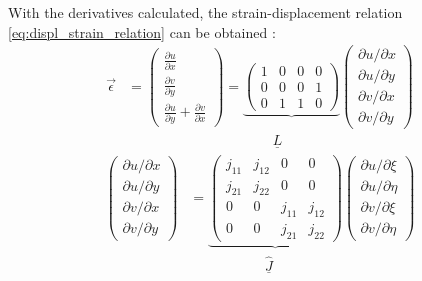   With the derivatives calculated, the strain-displacement relation \ref{eq:displ_strain_relation} can be obtained \cite{cook2002concepts}:
  \begin{align}
  \vec{\epsilon} &= \begin{pmatrix}
  \frac{\partial u}{\partial x} \\
  \frac{\partial v}{\partial y} \\
  \frac{\partial u}{\partial y} + \frac{\partial v}{\partial x}
  \end{pmatrix} = \underbrace{\begin{pmatrix}
  1&0&0&0\\
  0&0&0&1\\
  0&1&1&0
  \end{pmatrix}} \begin{pmatrix}
  {\partial u}/{\partial x} \\ {\partial u}/{\partial y} \\ {\partial v}/{\partial x} \\ {\partial v}/{\partial y}
  \end{pmatrix} \\
  &\qquad\qquad\qquad\qquad\qquad\,\: \underline{L} \nonumber
  \end{align}
  \begin{align}
  \begin{pmatrix}
  {\partial u}/{\partial x} \\ {\partial u}/{\partial y} \\ {\partial v}/{\partial x} \\ {\partial v}/{\partial y}
  \end{pmatrix} &= \underbrace{\begin{pmatrix}
  j_{11} & j_{12} & 0 & 0\\
  j_{21} & j_{22} & 0 & 0\\
  0 & 0 & j_{11} & j_{12}\\
  0 & 0 & j_{21} & j_{22}
  \end{pmatrix}} \begin{pmatrix}
  {\partial u}/{\partial \xi} \\ {\partial u}/{\partial \eta} \\ {\partial v}/{\partial \xi} \\ {\partial v}/{\partial \eta}
  \end{pmatrix}\\
  &\qquad\qquad\quad\,\: \underline{\hat{J}} \nonumber
  \end{align}
